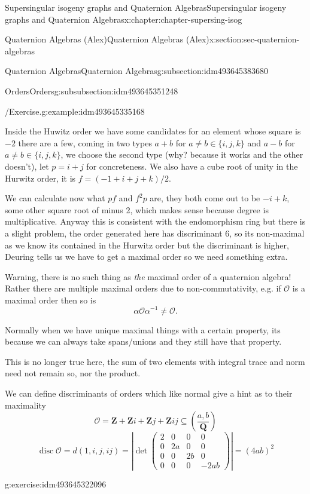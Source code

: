 \documentclass[oneside,10pt,]{book}
\numberwithin{equation}{section}
\newcommand{\inv}{^{-1}}
\newcommand{\legendre}[2]{\left(\frac{#1}{#2}\right)}
\newcommand{\ZZ}{\mathbf{Z}}
\newcommand{\QQ}{\mathbf{Q}}
\newcommand{\ints}{\mathcal{O}}
\DeclareMathOperator{\disc}{disc}
\newcommand{\amp}{&}
\begin{document}
\begin{chapterptx}{Supersingular isogeny graphs and Quaternion Algebras}{}{Supersingular isogeny graphs and Quaternion Algebras}{}{}{x:chapter:chapter-supersing-isog}
\begin{sectionptx}{Quaternion Algebras (Alex)}{}{Quaternion Algebras (Alex)}{}{}{x:section:sec-quaternion-algebras}
\begin{subsectionptx}{Quaternion Algebras}{}{Quaternion Algebras}{}{}{g:subsection:idm493645383680}
\begin{subsubsectionptx}{Orders}{}{Orders}{}{}{g:subsubsection:idm493645351248}
\begin{example}{\slash{}Exercise.}{g:example:idm493645335168}
\par
Inside the Huwitz order we have some candidates for an element whose square is \(-2\) there are a few, coming in two types \(a+ b\) for \(a \ne b \in \{i,j,k\}\) and \(a-b\) for \(a\ne b\in \{i,j,k\}\), we choose the second type (why? because it works and the other doesn't), let \(p = i + j\) for concreteness. We also have a cube root of unity in the Hurwitz order, it is \(f = (-1 + i + j + k)/2\).%
\par
We can calculate now what \(pf\) and \(f^2 p\) are, they both come out to be \(- i + k\), some other square root of minus 2, which makes sense because degree is multiplicative. Anyway this is consistent with the endomorphism ring but there is a slight problem, the order generated here has discriminant \(6\), so its non-maximal as we know its contained in the Hurwitz order but the discriminant is higher, Deuring tells us we have to get a maximal order so we need something extra.%
\end{example}
Warning, there is no such thing as \emph{the} maximal order of a quaternion algebra! Rather there are multiple maximal orders due to non-commutativity, e.g. if \(\ints\) is a maximal order then so is%
\begin{equation*}
\alpha \ints \alpha\inv \ne \ints\text{.}
\end{equation*}
%
\par
Normally when we have unique maximal things with a certain property, its because we can always take spans\slash{}unions and they still have that property.%
\par
This is no longer true here, the sum of two elements with integral trace and norm need not remain so, nor the product.%
\par
We can define discriminants of orders which like normal give a hint as to their maximality%
\begin{equation*}
\ints = \ZZ + \ZZ i + \ZZ j + \ZZ ij \subseteq \legendre{a,b}{\QQ}
\end{equation*}
%
\begin{equation*}
\disc \ints  = d(1,i,j,ij) = \left| \det\begin{pmatrix} 2 \amp 0 \amp 0\amp 0 \\ 0 \amp 2a \amp 0 \amp 0 \\ 0 \amp 0 \amp 2b \amp 0 \\ 0 \amp 0 \amp 0 \amp -2ab\end{pmatrix}\right| = (4ab)^2
\end{equation*}
%
\begin{inlineexercise}{}{g:exercise:idm493645322096}%

\end{inlineexercise}
\end{subsubsectionptx}
\end{subsectionptx}
\end{sectionptx}
\end{chapterptx}
\end{document}
